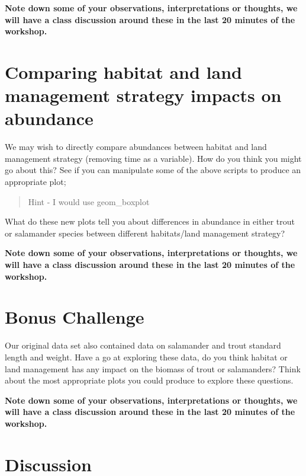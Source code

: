 \documentclass[
]{book}
\begin{document}
\textbf{Note down some of your observations, interpretations or thoughts, we will have a class discussion around these in the last 20 minutes of the workshop.}

\hypertarget{comparing-habitat-and-land-management-strategy-impacts-on-abundance}{%
\section{Comparing habitat and land management strategy impacts on abundance}\label{comparing-habitat-and-land-management-strategy-impacts-on-abundance}}

We may wish to directly compare abundances between habitat and land management strategy (removing time as a variable). How do you think you might go about this? See if you can manipulate some of the above scripts to produce an appropriate plot;

\begin{quote}
Hint - I would use geom\_boxplot
\end{quote}

What do these new plots tell you about differences in abundance in either trout or salamander species between different habitats/land management strategy?

\textbf{Note down some of your observations, interpretations or thoughts, we will have a class discussion around these in the last 20 minutes of the workshop. }

\hypertarget{bonus-challenge}{%
\section{Bonus Challenge}\label{bonus-challenge}}

Our original data set also contained data on salamander and trout standard length and weight. Have a go at exploring these data, do you think habitat or land management has any impact on the biomass of trout or salamanders? Think about the most appropriate plots you could produce to explore these questions.

\textbf{Note down some of your observations, interpretations or thoughts, we will have a class discussion around these in the last 20 minutes of the workshop. }

\hypertarget{discussion}{%
\section{Discussion}\label{discussion}}
\end{document}
